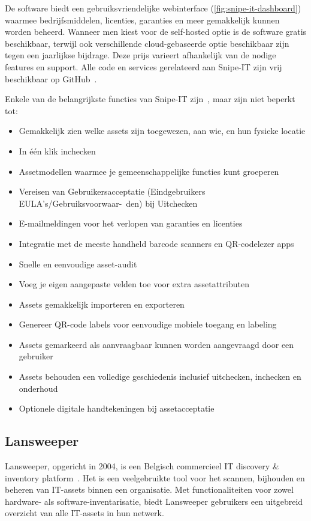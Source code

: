De software biedt een gebruiksvriendelijke webinterface (\ref{fig:snipe-it-dashboard}) waarmee bedrijfsmiddelen, licenties, garanties en meer gemakkelijk kunnen worden beheerd.
Wanneer men kiest voor de self-hosted optie is de software gratis beschikbaar, terwijl ook verschillende cloud-gebaseerde optie beschikbaar zijn tegen een jaarlijkse bijdrage.
Deze prijs varieert afhankelijk van de nodige features en support.
Alle code en services gerelateerd aan Snipe-IT zijn vrij beschikbaar op GitHub~\autocite{snipe-it-github}.

Enkele van de belangrijkste functies van Snipe-IT zijn~\autocite{snipe-it-features}, maar zijn niet beperkt tot:
\begin{itemize}
    \item Gemakkelijk zien welke assets zijn toegewezen, aan wie, en hun fysieke locatie
    \item In één klik inchecken
    \item Assetmodellen waarmee je gemeenschappelijke functies kunt groeperen
    \item Vereisen van Gebruikersacceptatie (Eindgebruikers EULA's/Gebruiksvoorwaar-\ den) bij Uitchecken
    \item E-mailmeldingen voor het verlopen van garanties en licenties
    \item Integratie met de meeste handheld barcode scanners en QR-codelezer apps
    \item Snelle en eenvoudige asset-audit
    \item Voeg je eigen aangepaste velden toe voor extra assetattributen
    \item Assets gemakkelijk importeren en exporteren
    \item Genereer QR-code labels voor eenvoudige mobiele toegang en labeling
    \item Assets gemarkeerd als aanvraagbaar kunnen worden aangevraagd door een gebruiker
    \item Assets behouden een volledige geschiedenis inclusief uitchecken, inchecken en onderhoud
    \item Optionele digitale handtekeningen bij assetacceptatie
\end{itemize}

\subsection{Lansweeper}
\label{sub:lansweeper}

Lansweeper, opgericht in 2004, is een Belgisch commercieel IT discovery \& inventory platform~\autocite{lansweeper-history}.
Het is een veelgebruikte tool voor het scannen, bijhouden en beheren van IT-assets binnen een organisatie.
Met functionaliteiten voor zowel hardware- als software-inventarisatie, biedt Lansweeper gebruikers een uitgebreid overzicht van alle IT-assets in hun netwerk.


